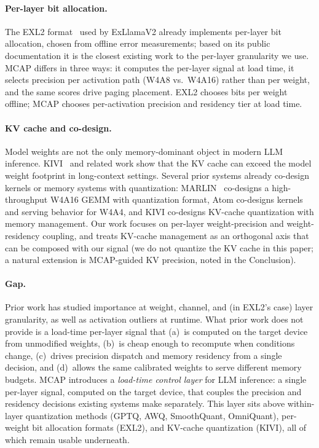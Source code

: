 \documentclass{article}
\begin{document}
\paragraph{Per-layer bit allocation.} The EXL2
format~\cite{turboderp2024exl2} used by ExLlamaV2 already implements
per-layer bit allocation, chosen from offline error measurements; based on
its public documentation it is the closest existing work to the per-layer
granularity we use. MCAP differs in three ways: it computes the per-layer signal at load
time, it selects precision per activation path (W4A8 vs.\ W4A16) rather
than per weight, and the same scores drive paging placement. EXL2 chooses
bits per weight offline; MCAP chooses per-activation precision and
residency tier at load time.

\paragraph{KV cache and co-design.} Model weights are not the only
memory-dominant object in modern LLM inference. KIVI~\cite{liu2024kivi} and
related work show that the KV cache can exceed the model weight footprint in
long-context settings. Several prior systems already co-design kernels or
memory systems with quantization: MARLIN~\cite{frantar2024marlin} co-designs
a high-throughput W4A16 GEMM with quantization format, Atom co-designs
kernels and serving behavior for W4A4, and KIVI co-designs KV-cache
quantization with memory management. Our work focuses on per-layer
weight-precision and weight-residency coupling, and treats KV-cache
management as an orthogonal axis that can be composed with our signal
(we do not quantize the KV cache in this paper; a natural extension is
MCAP-guided KV precision, noted in the Conclusion).

\paragraph{Gap.} Prior work has studied importance at weight, channel,
and (in EXL2's case) layer granularity, as well as activation outliers at
runtime. What prior work does not provide is a load-time per-layer signal
that (a)~is computed on the target device from unmodified weights,
(b)~is cheap enough to recompute when conditions change, (c)~drives
precision dispatch and memory residency from a single decision, and
(d)~allows the same calibrated weights to serve different memory budgets.
MCAP introduces a \emph{load-time control layer} for LLM inference: a
single per-layer signal, computed on the target device, that couples the
precision and residency decisions existing systems make separately. This
layer sits above within-layer quantization methods (GPTQ, AWQ,
SmoothQuant, OmniQuant), per-weight bit allocation formats (EXL2), and
KV-cache quantization (KIVI), all of which remain usable underneath.
\end{document}
